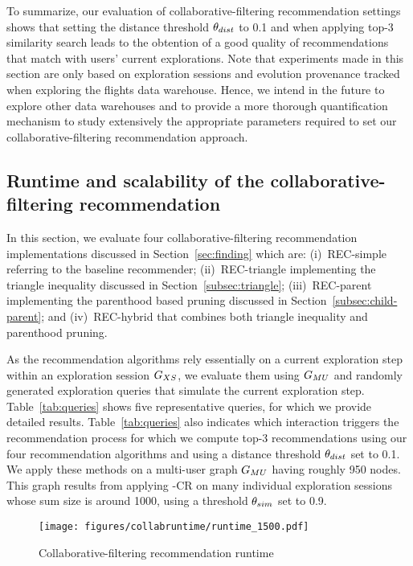 To summarize, our evaluation of collaborative-filtering recommendation settings shows that setting the distance threshold $\theta_{dist}$ to 0.1 and when applying top-3 similarity search leads to the obtention of a good quality of recommendations that match with users' current explorations. 
Note that experiments made in this section are only based on exploration sessions and evolution provenance tracked when exploring the flights data warehouse.  
Hence, we intend in the future to explore other data warehouses and to provide a more thorough quantification mechanism to study extensively the appropriate parameters required to set our collaborative-filtering recommendation approach.

 

 \subsection{Runtime and scalability of the collaborative-filtering recommendation}   
 In this section, we evaluate four collaborative-filtering recommendation implementations discussed in Section~\ref{sec:finding}
which are: (i)~REC-simple referring to the baseline recommender; (ii)~REC-triangle implementing the triangle inequality discussed in Section~\ref{subsec:triangle}; (iii)~REC-parent implementing the parenthood based pruning discussed in Section~\ref{subsec:child-parent};
 and (iv)~REC-hybrid that combines both triangle inequality and parenthood pruning.
 
 
As the recommendation algorithms rely essentially on a current exploration step within an exploration session $G_{XS}$, we evaluate them using $G_{MU}$ and randomly generated exploration queries that simulate the current exploration step.
Table~\ref{tab:queries} shows five representative queries, for which we provide detailed results. Table~\ref{tab:queries} also indicates which interaction triggers the recommendation process for which we compute top-3 recommendations using our four recommendation algorithms and using a distance threshold $\theta_{dist}$ set to 0.1. 
We apply these methods on a multi-user graph $G_{MU}$ having roughly 950 nodes.
This graph results from applying \mlm-CR{} on many individual exploration sessions whose sum size is around 1000, using a threshold $\theta_{sim}$ set to 0.9.

\begin{figure}[t]
\centering
\texttt{[image: figures/collabruntime/runtime\_1500.pdf]}
\caption{Collaborative-filtering recommendation runtime}
\label{fig:runtime_1500}
\end{figure}

